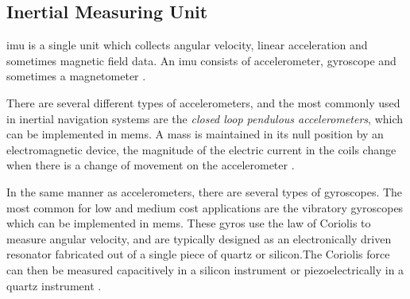 \subsection{Inertial Measuring Unit}
\acrfull{imu} is a single unit which collects angular velocity, linear acceleration and sometimes magnetic field data. An \acrshort{imu} consists of accelerometer, gyroscope and sometimes a magnetometer \cite{vik}. 

There are several different types of accelerometers, and the most commonly used in inertial navigation systems are the \textit{closed loop pendulous accelerometers}, which can be implemented in \acrfull{mems}. A mass is maintained in its null position by an electromagnetic device, the magnitude of the electric current in the coils change when there is a change of movement on the accelerometer \cite{vik}.

In the same manner as accelerometers, there are several types of gyroscopes. The most common for low and medium cost applications are the vibratory gyroscopes which can be implemented in \acrshort{mems}. These gyros use the law of Coriolis to measure angular velocity, and are typically designed as an electronically driven resonator fabricated out of a single piece of quartz or silicon.The Coriolis force can then be measured capacitively in a silicon instrument or piezoelectrically in a quartz instrument \cite{vik}.
\newpage